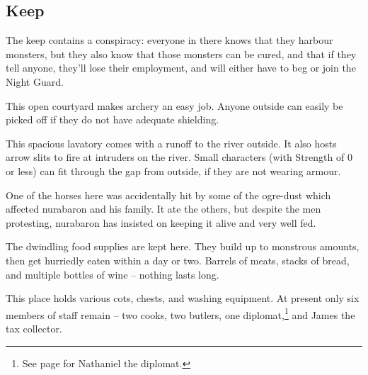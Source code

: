 \begin{multicols}{2}
\subsection*{ Keep}

\begin{figure*}[t!]



\end{figure*}
\label{redfall_keep_map}
\setcounter{list}{0}

The keep contains a conspiracy: everyone in there knows that they harbour monsters, but they also know that those monsters can be cured, and that if they tell anyone, they'll lose their employment, and will either have to beg or join the Night Guard.



This open courtyard makes archery an easy job.  Anyone outside can easily be picked off if they do not have adequate shielding.


This spacious lavatory comes with a runoff to the river outside.
It also hosts arrow slits to fire at intruders on the river.
Small characters (with Strength of 0 or less) can fit through the gap from outside, if they are not wearing armour.


One of the horses here was accidentally hit by some of the ogre-dust which affected \gls{nurabaron} and his family.  It ate the others, but despite the men protesting, \gls{nurabaron} has insisted on keeping it alive and very well fed.



The dwindling food supplies are kept here.  They build up to monstrous amounts, then get hurriedly eaten within a day or two.  Barrels of meats, stacks of bread, and multiple bottles of wine -- nothing lasts long.


This place holds various cots, chests, and washing equipment.  At present only six members of staff remain -- two cooks, two butlers, one diplomat,\footnote{See page \pageref{nathaniel} for Nathaniel the diplomat.} and James the tax collector.


\end{multicols}
